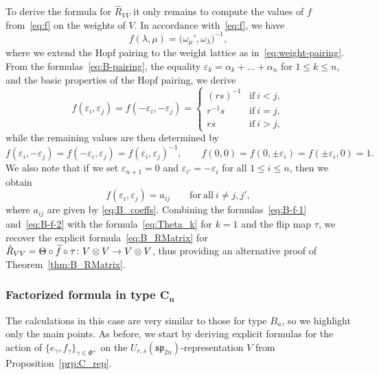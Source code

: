 \documentclass[pdftex]{sigma}
\numberwithin{equation}{section}
\newcommand{\ssp}{\mathfrak{sp}}
\begin{document}
To derive the formula for $\hat{R}_{VV}$ it only remains to compute the values of $f$ from~\eqref{eq:f} on the weights of $V$. In accordance with~\eqref{eq:f}, we have
\begin{displaymath}
 f(\lambda,\mu) = \bigl(\omega_{\mu}',\omega_{\lambda}\bigr)^{-1},
\end{displaymath}
where we extend the Hopf pairing to the weight lattice as in~\eqref{eq:weight-pairing}.
From the formulas~\eqref{eq:B-pairing}, the equality $\varepsilon_k=\alpha_{k}+\dots+\alpha_n$  for $1\leq k\leq n$, and the basic properties of the Hopf pairing, we derive
\begin{equation}\label{eq:B-f-1}
 f(\varepsilon_{i},\varepsilon_{j}) = f(-\varepsilon_{i},-\varepsilon_{j}) =
 \begin{cases}
 (rs)^{-1} & \text{if}\ i < j ,\\
 r^{-1}s & \text{if}\ i = j, \\
 rs & \text{if}\ i > j,
 \end{cases}
\end{equation}
while the remaining values are then determined by
\begin{equation}\label{eq:B-f-2}
 f(\varepsilon_{i},-\varepsilon_{j}) = f(-\varepsilon_{i},\varepsilon_{j}) = f(\varepsilon_{i},\varepsilon_{j})^{-1},\qquad
 f(0,0) = f(0, \pm \varepsilon_{i}) = f(\pm \varepsilon_{i},0) = 1.
\end{equation}
We also note that if we set $\varepsilon_{n+1} = 0$ and $\varepsilon_{i'} = -\varepsilon_{i}$ for all $1 \le i \le n$, then we obtain
\begin{equation}\label{eq:f_aij_B}
 f(\varepsilon_{i},\varepsilon_{j}) = a_{ij} \qquad \mathrm{for\ all} \ i \neq j,j',
\end{equation}
where $a_{ij}$ are given by \eqref{eq:B_coeffs}. Combining the formulas~\eqref{eq:B-f-1} and~\eqref{eq:B-f-2} with the formula~\eqref{eq:Theta_k} for $k=1$ and the flip map $\tau$, we recover the explicit formula~\eqref{eq:B_RMatrix} for $\smash{\hat{R}_{VV}=\Theta \circ \widetilde{f}} \circ \tau\colon V \otimes V \to V \otimes V$, thus providing an alternative proof of Theorem~\ref{thm:B_RMatrix}.

\subsubsection[Factorized formula in type C\_n]{Factorized formula in type $\boldsymbol{C_{n}}$}

The calculations in this case are very similar to those for type $B_{n}$, so we highlight only the main points.
As before, we start by deriving explicit formulas for the action of $\{e_\gamma,f_\gamma\}_{\gamma\in \Phi^+}$ on the $U_{r,s}(\ssp_{2n})$-representation $V$ from Proposition~\ref{prp:C_rep}.
\end{document}
